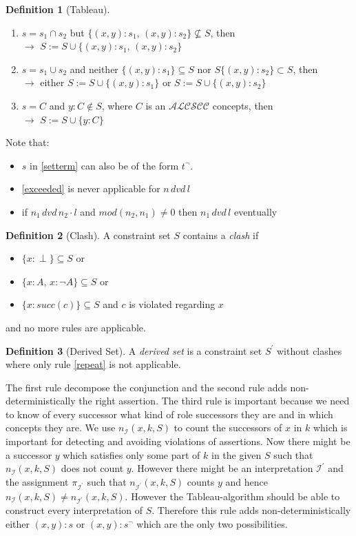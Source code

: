 \documentclass[a4paper,11pt]{scrartcl}
\theoremstyle{break}
\theoremstyle{definition}
\newtheorem{mydef}{Definition}
\begin{document}
\begin{mydef}[Tableau]
\begin{enumerate}
\begin{enumerate}
\item\label{setterm1} $s=s_1\cap s_2$ but $\{(x,y):s_1,\,(x,y):s_2\}\not\subseteq S$, then\\
$\rightarrow$ $S:=S\cup \{(x,y):s_1,\,(x,y):s_2\}$ 
\item\label{setterm2} $s=s_1\cup s_2$ and neither $\{(x,y):s_1\}\subseteq S$ nor $S\{(x,y):s_2\}\subset S$, then\\
$\rightarrow$ either $S:=S\cup \{(x,y):s_1\}$ or $S:=S\cup \{(x,y):s_2\}$ 
\item\label{setterm3} $s=C$ and $y:C\notin S$, where $C$ is an $\mathcal{ALCSCC}$ concepts, then \\
$\rightarrow$ $S:=S\cup\{y:C\}$
\end{enumerate}
\end{enumerate}
\end{mydef}
Note that:
\begin{itemize}
\item $s$ in \ref{setterm} can also be of the form $t^\neg$.
\item \ref{exceeded} is never applicable for $n\, dvd\, l$
\item if  $n_1\,dvd\,n_2\cdot l$ and $mod(n_2,n_1)\neq 0$ then $n_1\,dvd\,l$ eventually
\end{itemize}
\begin{mydef}[Clash]
A constraint set $S$ contains a \textit{clash} if
\begin{itemize}
\item $\{x:\perp\}\subseteq S$ or
\item $\{x:A,\,x:\neg A\}\subseteq S$ or
\item $\{x:succ(c)\}\subseteq S$ and $c$ is violated regarding $x$
\end{itemize}
and no more rules are applicable.
\end{mydef}
\begin{mydef}[Derived Set]
A \textit{derived set} is a constraint set $S^\prime$ without clashes where only rule \ref{repeat} is not applicable.
\end{mydef}
The first rule decompose the conjunction and the second rule adds non-deterministically the right assertion. The third rule is important because we need to know of every successor what kind of role successors they are and in which concepts they are. We use $n_\mathcal{I}(x,k,S)$ to count the successors of $x$ in $k$ which is important for detecting and avoiding violations of assertions. Now there might be a successor $y$ which satisfies only some part of $k$ in the given $S$ such that $n_\mathcal{I}(x,k,S)$ does not count $y$. However there might be an interpretation $\mathcal{I^\prime}$ and the assignment $\pi_\mathcal{I^\prime}$ such that $n_{\mathcal{I}^\prime}(x,k,S)$ counts $y$ and hence $n_{\mathcal{I}}(x,k,S)\neq n_{\mathcal{I}^\prime}(x,k,S)$. However the Tableau-algorithm should be able to construct every interpretation of $S$. Therefore this rule adds non-deterministically either $(x,y):s$ or $(x,y):s^\neg$ which are the only two possibilities.\\ 
\end{document}
